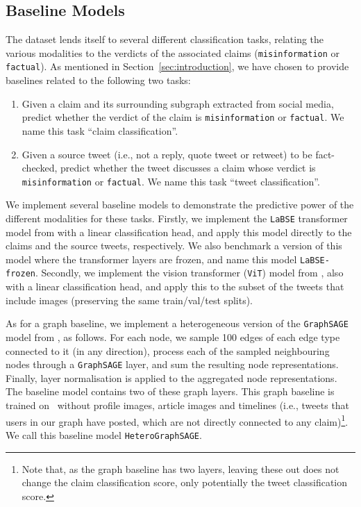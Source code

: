 \documentclass[sigconf,natbib=true,anonymous=false,nonacm]{acmart}
\begin{document}
\subsection{Baseline Models}
\label{sec:baselinemodels}
The \datasetname dataset lends itself to several different classification
tasks, relating the various modalities to the verdicts of the associated claims
(\texttt{misinformation} or \texttt{factual}). As mentioned in
Section~\ref{sec:introduction}, we have chosen to provide baselines related to
the following two tasks:

\begin{enumerate}
    \item Given a claim and its surrounding subgraph extracted from
        social media, predict whether the verdict of the claim is
        \texttt{misinformation} or \texttt{factual}.
        We name this task ``claim classification''.
    \item Given a source tweet (i.e., not a reply, quote tweet or retweet) to
        be fact-checked, predict whether the tweet discusses a claim whose
        verdict is \texttt{misinformation} or \texttt{factual}. We name this
        task ``tweet classification''.
\end{enumerate}

We implement several baseline models to demonstrate the predictive power of the
different modalities for these tasks. Firstly, we implement the \texttt{LaBSE}
transformer model from \cite{feng2020language} with a linear classification
head, and apply this model directly to the claims and the source tweets,
respectively. We also benchmark a version of this model where the transformer
layers are frozen, and name this model \texttt{LaBSE-frozen}. Secondly, we
implement the vision transformer (\texttt{ViT}) model from
\cite{dosovitskiy2020image}, also with a linear classification head, and apply
this to the subset of the tweets that include images (preserving the same
train/val/test splits).

As for a graph baseline, we implement a heterogeneous version of the
\texttt{GraphSAGE} model from \cite{hamilton2017inductive}, as follows. For
each node, we sample 100 edges of each edge type connected to it (in any
direction), process each of the sampled neighbouring nodes through a
\texttt{GraphSAGE} layer, and sum the resulting node representations. Finally,
layer normalisation \cite{ba2016layer} is applied to the aggregated node
representations. The baseline model contains two of these graph layers. This
graph baseline is trained on \datasetname\ without profile images, article
images and timelines (i.e., tweets that users in our graph have posted, which
are not directly connected to any claim)\footnote{Note that, as the graph
baseline has two layers, leaving these out does not change the claim
classification score, only potentially the tweet classification score.}.
We call this baseline model \texttt{HeteroGraphSAGE}.
\end{document}
